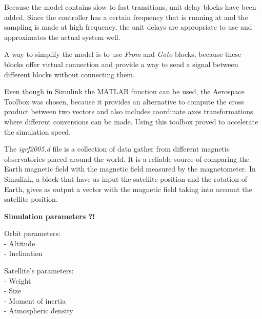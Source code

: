 Because the model contains slow to fast transitions, unit delay blocks have been added. Since the controller has a certain frequency that is running at and the sampling is made at high frequency, the unit delays are appropriate to use and approximates the actual system well.


A way to simplify the model is to use \textit{From} and \textit{Goto} blocks, because these blocks offer virtual connection and provide a way to send a signal between different blocks without connecting them.

Even though in Simulink the MATLAB function can be used, the Aerospace Toolbox was chosen, because it provides an alternative to compute the cross product between two vectors and also includes coordinate axes transformations where different conversions can be made. Using this toolbox proved to accelerate the simulation speed.

The\textit{ igrf2005.d} file is a collection of data gather from different magnetic observatories placed around the world. It is a reliable source of comparing the Earth magnetic field with the magnetic field measured by the magnetometer.
In Simulink, a block that have as input the satellite position and the rotation of Earth, gives as output a vector with the magnetic field taking into account the satellite position.

\textbf{Simulation parameters ?!} 

Orbit parameters: \\
- Altitude\\
- Inclination 

Satellite’s parameters: \\
- Weight \\
- Size \\
- Moment of inertia \\
- Atmospheric density